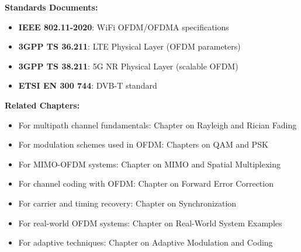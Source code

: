 \textbf{Standards Documents:}
\begin{itemize}
\item \textbf{IEEE 802.11-2020}: WiFi OFDM/OFDMA specifications
\item \textbf{3GPP TS 36.211}: LTE Physical Layer (OFDM parameters)
\item \textbf{3GPP TS 38.211}: 5G NR Physical Layer (scalable OFDM)
\item \textbf{ETSI EN 300 744}: DVB-T standard
\end{itemize}

\textbf{Related Chapters:}
\begin{itemize}
\item For multipath channel fundamentals: Chapter on Rayleigh and Rician Fading
\item For modulation schemes used in OFDM: Chapters on QAM and PSK
\item For MIMO-OFDM systems: Chapter on MIMO and Spatial Multiplexing
\item For channel coding with OFDM: Chapter on Forward Error Correction
\item For carrier and timing recovery: Chapter on Synchronization
\item For real-world OFDM systems: Chapter on Real-World System Examples
\item For adaptive techniques: Chapter on Adaptive Modulation and Coding
\end{itemize}
